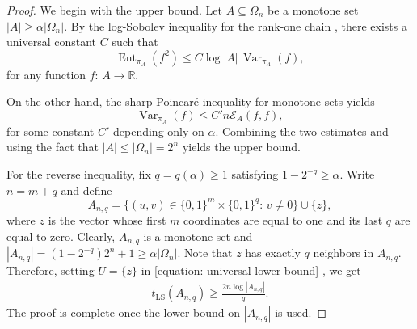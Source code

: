 \documentclass[12pt,final]{amsart}
\newcommand{\var}{\operatorname{Var}}
\newcommand{\1}{\mathbf{1}}
\newcommand{\Ent}{\operatorname{Ent}}
\newcommand{\Ecal}{\mathcal{E}}
\newcommand{\R}{\mathbb{R}}
\begin{document}
\begin{proof}
We begin with the upper bound. Let $A\subseteq \Omega_n$ be a monotone set $|A|\geq \alpha|\Omega_n|$. By the log-Sobolev inequality for the rank-one chain \cite[Theorem 2.2.9]{S-C97}, there exists a universal constant $C$ such that
   $$
   \Ent_{\pi_A}(f^2)\leq C\log  |A|\, \var_{\pi_A}(f),
   $$
   for any function $f:\, A\to \R$.
   
On the other hand, the sharp Poincaré inequality for monotone sets \cite{fei2025spectral} yields 
$$
\var_{\pi_A}(f)\leq C' n \Ecal_A(f,f),
$$
for some constant $C'$ depending only on $\alpha$. Combining the two estimates and using the fact that $|A|\leq |\Omega_n|=2^n$ yields the upper bound. 

For the reverse inequality, fix $q=q(\alpha)\geq 1$ satisfying $1-2^{-q}\geq \alpha$. Write $n=m+q$ and define 
$$
A_{n,q}= \{(u,v)\in \{0,1\}^{m}\times \{0,1\}^q:\, v\neq 0\}\cup \{z\},
$$
where $z$ is the vector whose first $m$ coordinates are equal to one and its last $q$ are equal to zero. 
Clearly, $A_{n,q}$ is a monotone set and 
$|A_{n,q}|= (1-2^{-q})2^n+1\geq \alpha |\Omega_n|$.
Note that $z$ has exactly $q$ neighbors in $A_{n,q}$. Therefore, setting $U=\{z\}$ in \eqref{equation: universal lower bound} , we get
\begin{align*}
    t_{\operatorname{LS}}(A_{n,q})\geq \frac{2n \log |A_{n,q}|}{q}.
\end{align*}
The proof is complete once the lower bound on $|A_{n,q}|$ is used.
\end{proof}
\end{document}
